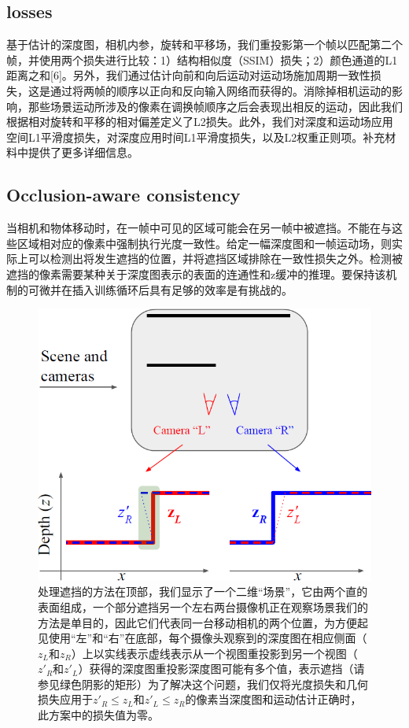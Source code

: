 \documentclass[10pt,journal,compsoc,UTF8]{IEEEtran}
\begin{document}
\subsection{losses}
基于估计的深度图，相机内参，旋转和平移场，我们重投影第一个帧以匹配第二个帧，并使用两个损失进行比较：1）结构相似度（SSIM）损失；2）颜色通道的L1距离之和[6]。另外，我们通过估计向前和向后运动对运动场施加周期一致性损失，这是通过将两帧的顺序以正向和反向输入网络而获得的。消除掉相机运动的影响，那些场景运动所涉及的像素在调换帧顺序之后会表现出相反的运动，因此我们根据相对旋转和平移的相对偏差定义了L2损失。此外，我们对深度和运动场应用空间L1平滑度损失，对深度应用时间L1平滑度损失，以及L2权重正则项。补充材料中提供了更多详细信息。

\subsection{Occlusion-aware consistency}
当相机和物体移动时，在一帧中可见的区域可能会在另一帧中被遮挡。不能在与这些区域相对应的像素中强制执行光度一致性。给定一幅深度图和一帧运动场，则实际上可以检测出将发生遮挡的位置，并将遮挡区域排除在一致性损失之外。检测被遮挡的像素需要某种关于深度图表示的表面的连通性和z缓冲的推理。要保持该机制的可微并在插入训练循环后具有足够的效率是有挑战的。
\begin{figure}[htbp]
  \begin{framed}
  \centering
    \includegraphics[width=1\linewidth]{imgs/3.png} 
  \caption{处理遮挡的方法在顶部，我们显示了一个二维“场景”，它由两个直的表面组成，一个部分遮挡另一个左右两台摄像机正在观察场景我们的方法是单目的，因此它们代表同一台移动相机的两个位置，为方便起见使用“左”和“右”在底部，每个摄像头观察到的深度图在相应侧面（$z_L$和$z_R$）上以实线表示虚线表示从一个视图重投影到另一个视图（$z'_R$和$z'_L$）获得的深度图重投影深度图可能有多个值，表示遮挡（请参见绿色阴影的矩形）为了解决这个问题，我们仅将光度损失和几何损失应用于$z'_R\leq z_L$和$z'_L\leq z_R$的像素当深度图和运动估计正确时，此方案中的损失值为零。}
\end{framed}
\end{figure}
\end{document}
